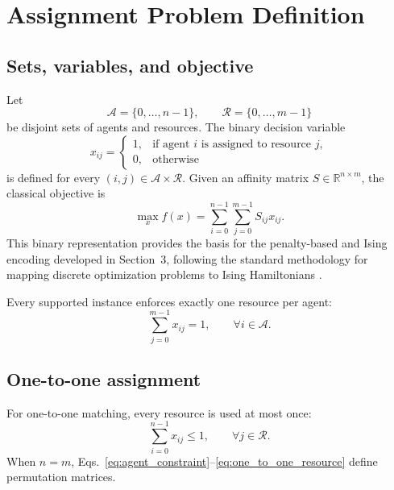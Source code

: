 \section{Assignment Problem Definition}

\subsection{Sets, variables, and objective}

Let
\begin{equation}
\mathcal A=\{0,\ldots,n-1\},\qquad
\mathcal R=\{0,\ldots,m-1\}
\end{equation}
be disjoint sets of agents and resources. The binary decision variable
\begin{equation}
x_{ij}=\begin{cases}
1,&\text{if agent }i\text{ is assigned to resource }j,\\
0,&\text{otherwise}
\end{cases}
\end{equation}
is defined for every $(i,j)\in\mathcal A\times\mathcal R$. Given an affinity matrix $S\in\mathbb R^{n\times m}$, the classical objective is
\begin{equation}
\max_x f(x)=\sum_{i=0}^{n-1}\sum_{j=0}^{m-1}S_{ij}x_{ij}.
\label{eq:objective}
\end{equation}
This binary representation provides the basis for the penalty-based \QUBO{} and Ising encoding developed in Section~3, following the standard methodology for mapping discrete optimization problems to Ising Hamiltonians \cite{lucas2014}.

Every supported instance enforces exactly one resource per agent:
\begin{equation}
\sum_{j=0}^{m-1}x_{ij}=1,
\qquad \forall i\in\mathcal A.
\label{eq:agent_constraint}
\end{equation}

\subsection{One-to-one assignment}

For one-to-one matching, every resource is used at most once:
\begin{equation}
\sum_{i=0}^{n-1}x_{ij}\leq 1,
\qquad \forall j\in\mathcal R.
\label{eq:one_to_one_resource}
\end{equation}
When $n=m$, Eqs.~\eqref{eq:agent_constraint}--\eqref{eq:one_to_one_resource} define permutation matrices.

